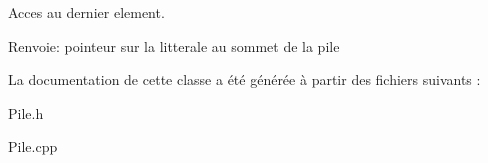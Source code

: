 Acces au dernier element. 

\begin{Desc}
\item[Renvoie:]pointeur sur la litterale au sommet de la pile \end{Desc}


La documentation de cette classe a été générée à partir des fichiers suivants :\begin{CompactItemize}
\item 
Pile.h\item 
Pile.cpp\end{CompactItemize}
